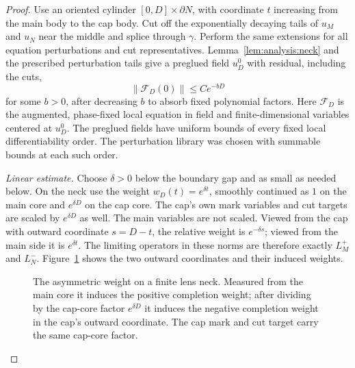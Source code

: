 \begin{proof}
Use an oriented cylinder $[0,D]\times\partial N$, with coordinate
$t$ increasing from the main body to the cap body.  Cut off the
exponentially decaying tails of $u_M$ and $u_N$ near the middle and
splice through $\gamma$.  Perform the same extensions for all
equation perturbations and cut representatives.  Lemma~\ref{lem:analysis:neck}
and the prescribed perturbation tails give a preglued field $u_D^0$
with residual, including the cuts,
\begin{equation}
 \|\mathcal F_D(0)\|\le C e^{-bD}
 \label{eq:gluing:residual}
\end{equation}
for some $b>0$, after decreasing $b$ to absorb fixed polynomial
factors.  Here $\mathcal F_D$ is the augmented, phase-fixed local
equation in field and finite-dimensional variables centered at
$u_D^0$.  The preglued fields have uniform bounds of every fixed
local differentiability order.  The perturbation library was
chosen with summable bounds at each such order.

\emph{Linear estimate.}
Choose $\delta>0$ below the boundary gap and as small as needed
below.  On the neck use the weight $w_D(t)=e^{\delta t}$, smoothly
continued as $1$ on the main core and $e^{\delta D}$ on the cap
core.  The cap's own mark variables and cut targets are scaled by
$e^{\delta D}$ as well.  The main variables are not scaled.
Viewed from the cap with outward coordinate $s=D-t$, the relative
weight is $e^{-\delta s}$; viewed from the main side it is
$e^{\delta t}$.  The limiting operators in these norms are
therefore exactly $L_M^+$ and $L_N^-$.
Figure~\ref{fig:gluing:weight} shows the two outward coordinates and
their induced weights.

\begin{figure}[htbp]
\centering
{}
\caption{The asymmetric weight on a finite lens neck.  Measured from
 the main core it induces the positive completion weight; after dividing
 by the cap-core factor $e^{\delta D}$ it induces the negative completion
 weight in the cap's outward coordinate.  The cap mark and cut target
 carry the same cap-core factor.}
\label{fig:gluing:weight}
\end{figure}


\end{proof}
